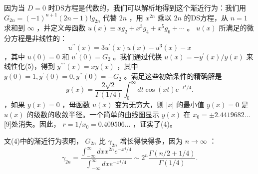 \documentclass[UTF8]{article}
\begin{document}
因为当 \( D=0 \) 时DS方程是代数的，我们可以解析地得到这个渐近行为：我们用 \( G_{2 n}=(-1)^{n+1}(2 n-1) ! g_{2 n} \) 代替 \( 2 n \) ，用 \( x^{2 n} \) 乘以 \( 2 n \) 的DS方程，从 \( n=1 \) 求和到 \( \infty \) ，并定义母函数 \( u(x) \equiv x g_{2}+x^{3} g_{4}+x^{5} g_{6}+\cdots \) 。 \( u(x) \) 所满足的微分方程是非线性的： \[u^{\prime \prime}(x)=3 u^{\prime}(x) u(x)-u^{3}(x)-x
\] ，其中 \( u(0)=0 \) 和 \( u^{\prime}(0)=G_{2} \) 。我们通过代换 \( u(x)=-y^{\prime}(x) / y(x) \) 来线性化(5)，得到 \( y^{\prime \prime \prime}(x)=x y(x) \) ，其中 \( y(0)=1, y^{\prime}(0)=0, y^{\prime \prime}(0)=-G_{2} \) 。满足这些初始条件的精确解是 \[y(x)=\frac{2 \sqrt{2}}{\Gamma(1 / 4)} \int_{0}^{\infty} d t \cos (x t) e^{-t^{4} / 4} .
\] ，如果 \( y(x)=0 \) ，母函数 \( u(x) \) 变为无穷大，则 \( |x| \) 的最小值 \( y(x)=0 \) 是 \( u(x) \) 的级数的收敛半径。一个简单的曲线图显示 \( y(x) \) 在 \( x_{0}= \pm 2.4419682 \ldots \) [9]处消失。因此， \( r=1 / x_{0}=0.409506 \ldots \) ，证实了(4)。


文(4)中的渐近行为表明， \( G_{2 n} \) 比 \( \gamma_{2 n} \) 增长得快得多，因为 \( n \rightarrow \infty \) ： \[
\gamma_{2 n}=\frac{\int_{-\infty}^{\infty} d x x^{2 n} e^{-x^{4} / 4}}{\int_{-\infty}^{\infty} d x e^{-x^{4} / 4}} \sim 2^{n} \frac{\Gamma(n / 2+1 / 4)}{\Gamma(1 / 4)} .
\] 
\end{document}
